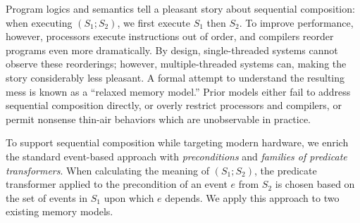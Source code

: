 
Program logics and semantics tell a pleasant story about sequential
composition: when executing $(S_1; S_2)$, we first execute $S_1$ then $S_2$.
To improve performance, however, processors execute instructions out of
order, and compilers reorder programs even more dramatically.  By design,
single-threaded systems cannot observe these reorderings; however,
multiple-threaded systems can, making the story considerably less pleasant.
A formal attempt to understand the resulting mess is known as a ``relaxed
memory model.''  Prior models either fail to address sequential composition
directly, or overly restrict processors and compilers, or permit nonsense
thin-air behaviors which are unobservable in practice.

To support sequential composition while targeting modern hardware, we enrich
the standard event-based approach with \emph{preconditions} and
\emph{families of predicate transformers}.
%
When calculating the meaning of $(S_1;S_2)$, the predicate transformer applied to the
precondition of an event $e$ from ${S_2}$ is chosen based on the set of
events in ${S_1}$ upon which $e$ depends.  We apply this approach to two
existing memory models.


\endinput
